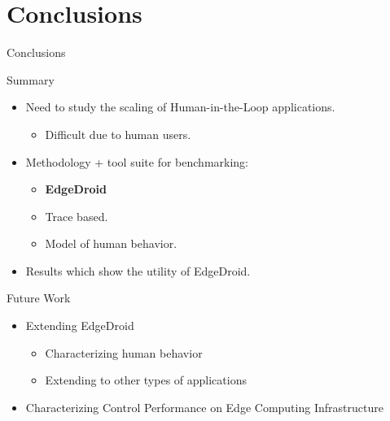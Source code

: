\documentclass[aspectratio=1610]{beamer}
\begin{document}
\section{Conclusions}
\begin{frame}{Conclusions}
    \begin{block}{Summary}
        \begin{itemize}
            \item Need to study the scaling of Human-in-the-Loop applications.
                  \begin{itemize}
                      \item Difficult due to human users.
                  \end{itemize}
            \item Methodology + tool suite for benchmarking:
                  \begin{itemize}
                      \item \textbf{EdgeDroid}
                      \item Trace based.
                      \item Model of human behavior.
                  \end{itemize}
            \item Results which show the utility of EdgeDroid.
        \end{itemize}
    \end{block}

    \begin{block}{Future Work}
        \begin{itemize}
            \item Extending EdgeDroid
            \begin{itemize}
                \item Characterizing human behavior
                \item Extending to other types of applications
            \end{itemize}
            \item Characterizing Control Performance on Edge Computing Infrastructure
        \end{itemize}
    \end{block}

\end{frame}
\end{document}
